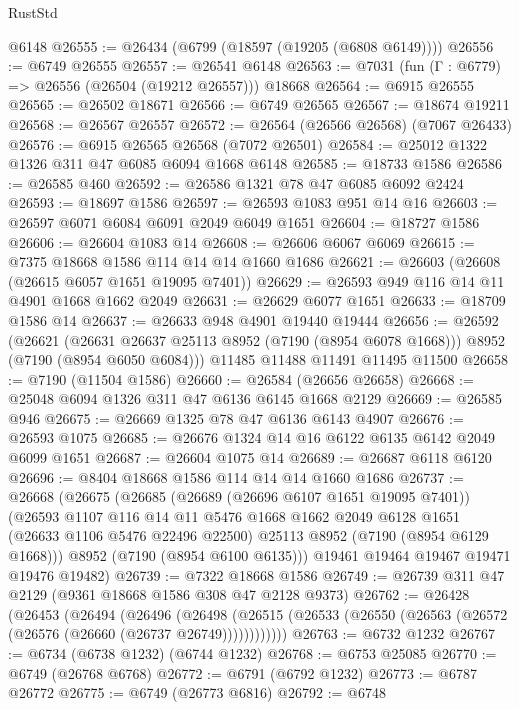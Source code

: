\begin{lexlean}{RustStd}
\begin{coremodule}
    @6148
@26555 := @26434 (@6799 (@18597 (@19205 (@6808 @6149))))
@26556 := @6749 @26555
@26557 := @26541 @6148
@26563 := @7031 (fun (Γ : @6779) => @26556 (@26504 (@19212 @26557))) @18668
@26564 := @6915 @26555
@26565 := @26502 @18671
@26566 := @6749 @26565
@26567 := @18674 @19211
@26568 := @26567 @26557
@26572 := @26564 (@26566 @26568) (@7067 @26433)
@26576 := @6915 @26565 @26568 (@7072 @26501)
@26584 := @25012 @1322 @1326 @311 @47 @6085 @6094 @1668 @6148
@26585 := @18733 @1586
@26586 := @26585 @460
@26592 := @26586 @1321 @78 @47 @6085 @6092 @2424
@26593 := @18697 @1586
@26597 := @26593 @1083 @951 @14 @16
@26603 := @26597 @6071 @6084 @6091 @2049 @6049 @1651
@26604 := @18727 @1586
@26606 := @26604 @1083 @14
@26608 := @26606 @6067 @6069
@26615 := @7375 @18668 @1586 @114 @14 @14 @1660 @1686
@26621 := @26603 (@26608 (@26615 @6057 @1651 @19095 @7401))
@26629 := @26593 @949 @116 @14 @11 @4901 @1668 @1662 @2049
@26631 := @26629 @6077 @1651
@26633 := @18709 @1586 @14
@26637 := @26633 @948 @4901 @19440 @19444
@26656 := @26592
    (@26621
      (@26631 @26637 @25113 @8952 (@7190 (@8954 @6078 @1668)))
      @8952
      (@7190 (@8954 @6050 @6084)))
    @11485
    @11488
    @11491
    @11495
    @11500
@26658 := @7190 (@11504 @1586)
@26660 := @26584 (@26656 @26658)
@26668 := @25048 @6094 @1326 @311 @47 @6136 @6145 @1668 @2129
@26669 := @26585 @946
@26675 := @26669 @1325 @78 @47 @6136 @6143 @4907
@26676 := @26593 @1075
@26685 := @26676 @1324 @14 @16 @6122 @6135 @6142 @2049 @6099 @1651
@26687 := @26604 @1075 @14
@26689 := @26687 @6118 @6120
@26696 := @8404 @18668 @1586 @114 @14 @14 @1660 @1686
@26737 := @26668
    (@26675
      (@26685
        (@26689 (@26696 @6107 @1651 @19095 @7401))
        (@26593
          @1107
          @116
          @14
          @11
          @5476
          @1668
          @1662
          @2049
          @6128
          @1651
          (@26633 @1106 @5476 @22496 @22500)
          @25113
          @8952
          (@7190 (@8954 @6129 @1668)))
        @8952
        (@7190 (@8954 @6100 @6135)))
      @19461
      @19464
      @19467
      @19471
      @19476
      @19482)
@26739 := @7322 @18668 @1586
@26749 := @26739 @311 @47 @2129 (@9361 @18668 @1586 @308 @47 @2128 @9373)
@26762 := @26428
    (@26453
      (@26494
        (@26496
          (@26498 (@26515 (@26533 (@26550 (@26563 (@26572 (@26576 (@26660 (@26737 @26749))))))))))))
@26763 := @6732 @1232
@26767 := @6734 (@6738 @1232) (@6744 @1232)
@26768 := @6753 @25085
@26770 := @6749 (@26768 @6768)
@26772 := @6791 (@6792 @1232)
@26773 := @6787 @26772
@26775 := @6749 (@26773 @6816)
@26792 := @6748

\end{coremodule}
\end{lexlean}
